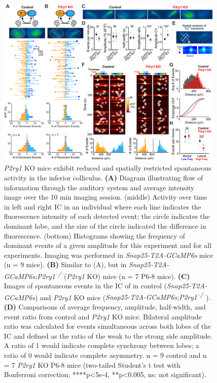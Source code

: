 \documentclass[9pt,lineno]{elife}
\begin{document}
\begin{figure}
\begin{fullwidth}
\includegraphics[width=.95\linewidth]{figures/Fig7.pdf}
\caption{\textit{P2ry1} KO mice exhibit reduced and spatially restricted spontaneous activity in the inferior colliculus.
\textbf{(A)} Diagram illustrating flow of information through the auditory system and average intensity image over the 10 min imaging session. (middle) Activity over time in left and right IC in an individual where each line indicates the fluorescence intensity of each detected event; the circle indicates the dominant lobe, and the size of the circle indicated the difference in fluorescence. (bottom) Histograms showing the frequency of dominant events of a given amplitude for this experiment and for all experiments. Imaging was performed in \textit{Snap25-T2A-GCaMP6s} mice (n = 9 mice).
\textbf{(B)} Similar to (A), but in \textit{Snap25-T2A-GCaMP6s;P2ry1\textsuperscript{–/–}}(\textit{P2ry1} KO) mice (n = 7 P6-8 mice).
\textbf{(C)} Images of spontaneous events in the IC of in control (\textit{Snap25-T2A-GCaMP6s}) and \textit{P2ry1} KO mice (\textit{Snap25-T2A-GCaMP6s;P2ry1\textsuperscript{–/–}}).
\textbf{(D)} Comparisons of average frequency, amplitude, half-width, and event ratio from control and \textit{P2ry1} KO mice. Bilateral amplitude ratio was calculated for events simultaneous across both lobes of the IC and defined as the ratio of the weak to the strong side amplitude. A ratio of 1 would indicate complete synchrony between lobes; a ratio of 0 would indicate complete asymmetry. n = 9 control and n = 7 \textit{P2ry1} KO P6-8 mice (two-tailed Student’s t test with Bonferroni correction; ****p<5e-4, **p<0.005, ns: not significant).
}
\end{fullwidth}
\end{figure}
\end{document}
